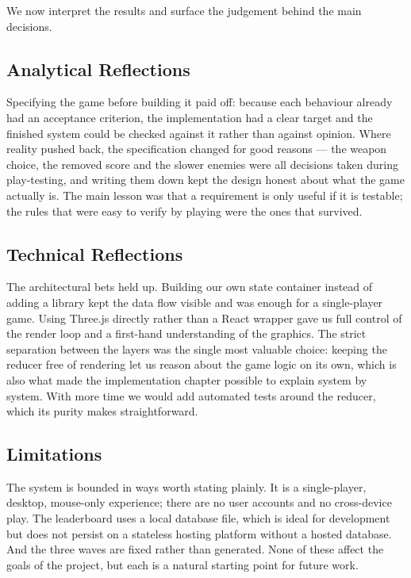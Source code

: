 \documentclass[12pt,a4paper]{report}
\begin{document}
We now interpret the results and surface the judgement behind the main
decisions.

\subsection{Analytical Reflections}

Specifying the game before building it paid off: because each behaviour already
had an acceptance criterion, the implementation had a clear target and the
finished system could be checked against it rather than against opinion. Where
reality pushed back, the specification changed for good reasons --- the weapon
choice, the removed score and the slower enemies were all decisions taken during
play-testing, and writing them down kept the design honest about what the game
actually is. The main lesson was that a requirement is only useful if it is
testable; the rules that were easy to verify by playing were the ones that
survived.

\subsection{Technical Reflections}

The architectural bets held up. Building our own state container instead of
adding a library kept the data flow visible and was enough for a single-player
game. Using Three.js directly
rather than a React wrapper gave us full control of the render loop and a
first-hand understanding of the graphics. The strict separation between the layers was the single
most valuable choice: keeping the reducer free of rendering let us reason about
the game logic on its own, which is also what made the implementation chapter
possible to explain system by system. With more time we would add automated
tests around the reducer, which its purity makes straightforward.


\subsection{Limitations}

The system is bounded in ways worth stating plainly. It is a single-player,
desktop, mouse-only experience; there are no user accounts and no cross-device
play. The leaderboard uses a local database file, which is ideal for development
but does not persist on a stateless hosting platform without a hosted database.
And the three waves are fixed rather than
generated. None of these affect the goals of the project, but each is a natural
starting point for future work.
\end{document}
